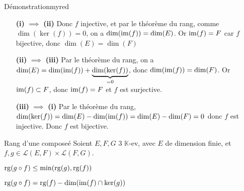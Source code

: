     \begin{demo}{Démonstration}{myred}
        \begin{itemize}[leftmargin=2.5cm]
            \item[\textbf{(i)} $\implies$ \textbf{(ii)}] Donc $f$ injective, et par le théorème du rang, comme $\dim(\ker(f)) = 0$, on a $\dim(\operatorname{im}(f)) = \dim(E)$. Or $\operatorname{im}(f) = F$ car $f$ bijective, donc $\dim(E) = \dim(F)$
            \item[\textbf{(ii)} $\implies$ \textbf{(iii)}] Par le théorème du rang, on a $\dim(E) = \dim(\operatorname{im}(f)) + \underbrace{\dim(\ker(f))}_{=0}$, donc $\dim(\operatorname{im}(f)) = \dim(F)$. Or $\operatorname{im}(f) \subset F$, donc $\operatorname{im}(f) = F$ et $f$ est surjective.
            \item[\textbf{(iii)} $\implies$ \textbf{(i)}] Par le théorème du rang, $\dim(\ker(f)) = \dim(E) - \dim(\operatorname{im}(f)) = \dim(E) - \dim(F) = 0$ donc $f$ est injective. Donc $f$ est bijective.
        \end{itemize}
    \end{demo}

    \begin{prop}{Rang d’une composeé}{}
        Soient $E,F,G$ 3 $\mathbb{K}$-ev, avec $E$ de dimension finie, et $f,g \in \mathcal{L}(E,F) \times \mathcal{L}(F,G)$. 

        \begin{alors}
            \item $\operatorname{rg}(g \circ f) \leq \min(\operatorname{rg}(g), \operatorname{rg}(f))$ 
            \item $\operatorname{rg}(g \circ f) = \operatorname{rg}(f) - \dim(\operatorname{im}(f) \cap \ker(g))$
        \end{alors}
    \end{prop}

